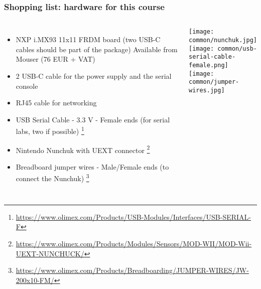 \begin{frame}
\frametitle{Shopping list: hardware for this course}
  \begin{columns}
    \footnotesize
    \begin{itemize}
      \item NXP i.MX93 11x11 FRDM board (two USB-C cables should be part of the package)
        Available from Mouser (76 EUR + VAT)
      \item 2 USB-C cable for the power supply and the serial console
      \item RJ45 cable for networking
      \item USB Serial Cable - 3.3 V - Female ends (for serial labs, two if possible)
            \footnote{\tiny \url{https://www.olimex.com/Products/USB-Modules/Interfaces/USB-SERIAL-F}}
      \item Nintendo Nunchuk with UEXT connector
            \footnote{\tiny \url{https://www.olimex.com/Products/Modules/Sensors/MOD-WII/MOD-Wii-UEXT-NUNCHUCK/}}
      \item Breadboard jumper wires - Male/Female ends (to connect the Nunchuk)
            \footnote{\tiny \url{https://www.olimex.com/Products/Breadboarding/JUMPER-WIRES/JW-200x10-FM/}}
    \end{itemize}
    \texttt{[image: common/nunchuk.jpg]} \\
    \texttt{[image: common/usb-serial-cable-female.png]} \\
    \texttt{[image: common/jumper-wires.jpg]}
  \end{columns}
\end{frame}
